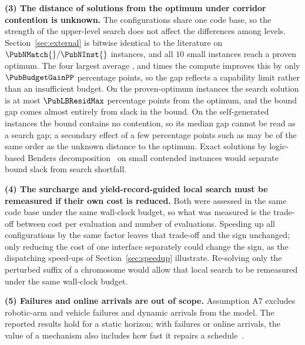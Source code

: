 \textbf{(3) The distance of solutions from the optimum under corridor contention is unknown.}
The configurations share one code base, so the strength of the upper-level search does not affect the differences among levels.
Section~\ref{sec:external} is bitwise identical to the literature on $\PubNMatch{}/\PubNInst{}$ instances, and all $10$ small instances reach a proven optimum.
The four largest average \PubGapBig{}, and \PubBudgetRatio{} times the compute improves this by only $\PubBudgetGainPP$ percentage points, so the gap reflects a capability limit rather than an insufficient budget.
On the \PubNOpt{} proven-optimum instances the search solution is at most $\PubLBResidMax$ percentage points from the optimum, and the bound gap comes almost entirely from slack in the bound.
On the self-generated instances the bound contains no contention, so its median gap \LBGapMed{} cannot be read as a search gap; a secondary effect of a few percentage points such as \GainProbeLoop{} may be of the same order as the unknown distance to the optimum.
Exact solutions by logic-based Benders decomposition~\cite{vanos2026exact} on small contended instances would separate bound slack from search shortfall.

\textbf{(4) The surcharge and yield-record-guided local search must be remeasured if their own cost is reduced.}
Both were assessed in the same code base under the same wall-clock budget, so what was measured is the trade-off between cost per evaluation and number of evaluations.
Speeding up all configurations by the same factor leaves that trade-off and the sign unchanged; only reducing the cost of one interface separately could change the sign, as the dispatching speed-ups of Section~\ref{sec:speedup} illustrate.
Re-solving only the perturbed suffix of a chromosome would allow that local search to be remeasured under the same wall-clock budget.

\textbf{(5) Failures and online arrivals are out of scope.}
Assumption A7 excludes robotic-arm and vehicle failures and dynamic arrivals from the model.
The reported results hold for a static horizon; with failures or online arrivals, the value of a mechanism also includes how fast it repairs a schedule~\cite{gui2023dynamic,xiong2024dynamic,dauzereperes2024fjsp}.









\endinput

